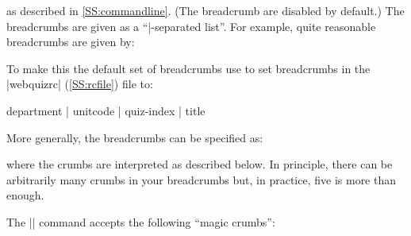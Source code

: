 \documentclass[svgnames]{article}
\newcommand\webquizrc{\index{webquizrc}%
  \BashCode|webquizrc| (\autoref{SS:rcfile})\xspace%
}
\begin{document}
    as described in \autoref{SS:commandline}.
    (The breadcrumb are disabled by default.)
    The breadcrumbs are given as a ``|-separated list''. For example,
    quite reasonable breadcrumbs are given by:
    \begin{latexcode}
    \end{latexcode}
    To make this the default set of breadcrumbs use
     to set breadcrumbs
    in the \webquizrc file to:
    \begin{latexcode}
       department | unitcode | quiz-index | title
    \end{latexcode}
    More generally, the breadcrumbs can be specified as:
    \begin{latexcode}
    \end{latexcode}
    where the crumbs are interpreted as described below.
    In principle, there can be arbitrarily many crumbs in your
    breadcrumbs but, in practice, five is more than enough.

    The \LatexCode|\BreadCrumbs| command accepts the following ``magic crumbs'':
\end{document}
